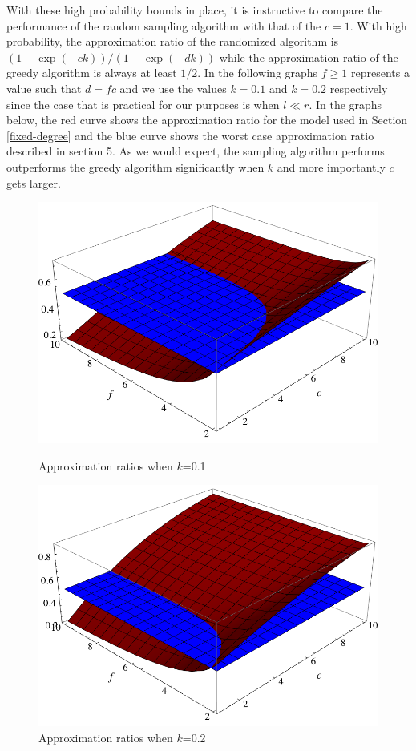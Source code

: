 With these high probability bounds in place, it is instructive to
compare the performance of the random sampling algorithm with that of
the $c=1$. With high probability, the approximation ratio of the
randomized algorithm is $(1-\exp(-ck))/(1-\exp(-dk))$ while the
approximation ratio of the greedy algorithm is always at least
$1/2$. In the following graphs $f\geq 1$ represents a value such that
$d=fc$ and we use the values $k=0.1$ and $k=0.2$ respectively since
the case that is practical for our purposes is when $l \ll r$. In the
graphs below, the red curve shows the approximation ratio for the
model used in Section \ref{fixed-degree} and the blue curve shows the
worst case approximation ratio described in section 5. As we would
expect, the sampling algorithm performs outperforms the greedy
algorithm significantly when $k$ and more importantly $c$ gets larger.

\begin{figure}[h]
\begin{minipage}[h]{0.45\linewidth}
\centering
\includegraphics[width=\textwidth]{k=0_1.png}
\caption{Approximation ratios when $k$=0.1}
\end{minipage}
\hspace{0.5cm}
\begin{minipage}[h]{0.45\linewidth}
\centering
\includegraphics[width=\textwidth]{k=0_2.png}
\caption{Approximation ratios when $k$=0.2}
\end{minipage}
\end{figure}